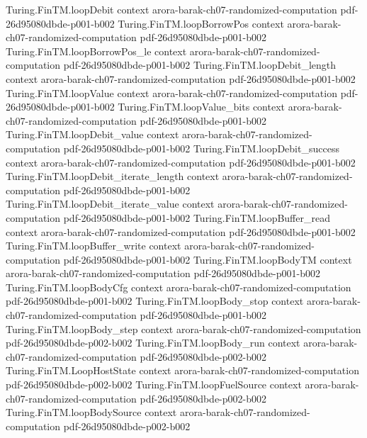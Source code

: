 \begin{theorem}
\proofstep
  {Turing.FinTM.loopDebit}
  {context}
  {arora-barak-ch07-randomized-computation}
  {pdf-26d95080dbde-p001-b002}
\proofstep
  {Turing.FinTM.loopBorrowPos}
  {context}
  {arora-barak-ch07-randomized-computation}
  {pdf-26d95080dbde-p001-b002}
\proofstep
  {Turing.FinTM.loopBorrowPos_le}
  {context}
  {arora-barak-ch07-randomized-computation}
  {pdf-26d95080dbde-p001-b002}
\proofstep
  {Turing.FinTM.loopDebit_length}
  {context}
  {arora-barak-ch07-randomized-computation}
  {pdf-26d95080dbde-p001-b002}
\proofstep
  {Turing.FinTM.loopValue}
  {context}
  {arora-barak-ch07-randomized-computation}
  {pdf-26d95080dbde-p001-b002}
\proofstep
  {Turing.FinTM.loopValue_bits}
  {context}
  {arora-barak-ch07-randomized-computation}
  {pdf-26d95080dbde-p001-b002}
\proofstep
  {Turing.FinTM.loopDebit_value}
  {context}
  {arora-barak-ch07-randomized-computation}
  {pdf-26d95080dbde-p001-b002}
\proofstep
  {Turing.FinTM.loopDebit_success}
  {context}
  {arora-barak-ch07-randomized-computation}
  {pdf-26d95080dbde-p001-b002}
\proofstep
  {Turing.FinTM.loopDebit_iterate_length}
  {context}
  {arora-barak-ch07-randomized-computation}
  {pdf-26d95080dbde-p001-b002}
\proofstep
  {Turing.FinTM.loopDebit_iterate_value}
  {context}
  {arora-barak-ch07-randomized-computation}
  {pdf-26d95080dbde-p001-b002}
\proofstep
  {Turing.FinTM.loopBuffer_read}
  {context}
  {arora-barak-ch07-randomized-computation}
  {pdf-26d95080dbde-p001-b002}
\proofstep
  {Turing.FinTM.loopBuffer_write}
  {context}
  {arora-barak-ch07-randomized-computation}
  {pdf-26d95080dbde-p001-b002}
\proofstep
  {Turing.FinTM.loopBodyTM}
  {context}
  {arora-barak-ch07-randomized-computation}
  {pdf-26d95080dbde-p001-b002}
\proofstep
  {Turing.FinTM.loopBodyCfg}
  {context}
  {arora-barak-ch07-randomized-computation}
  {pdf-26d95080dbde-p001-b002}
\proofstep
  {Turing.FinTM.loopBody_stop}
  {context}
  {arora-barak-ch07-randomized-computation}
  {pdf-26d95080dbde-p001-b002}
\proofstep
  {Turing.FinTM.loopBody_step}
  {context}
  {arora-barak-ch07-randomized-computation}
  {pdf-26d95080dbde-p002-b002}
\proofstep
  {Turing.FinTM.loopBody_run}
  {context}
  {arora-barak-ch07-randomized-computation}
  {pdf-26d95080dbde-p002-b002}
\proofstep
  {Turing.FinTM.LoopHostState}
  {context}
  {arora-barak-ch07-randomized-computation}
  {pdf-26d95080dbde-p002-b002}
\proofstep
  {Turing.FinTM.loopFuelSource}
  {context}
  {arora-barak-ch07-randomized-computation}
  {pdf-26d95080dbde-p002-b002}
\proofstep
  {Turing.FinTM.loopBodySource}
  {context}
  {arora-barak-ch07-randomized-computation}
  {pdf-26d95080dbde-p002-b002}

\end{theorem}
